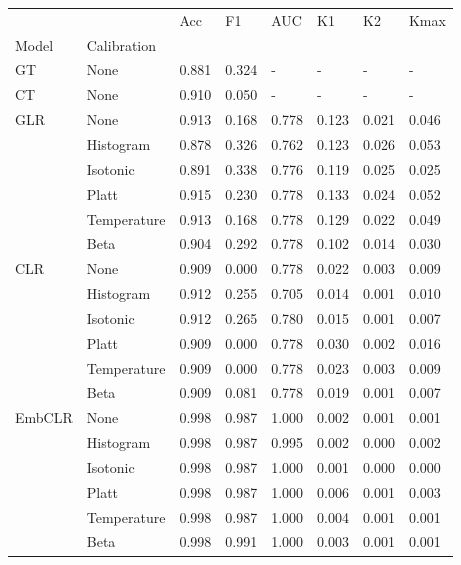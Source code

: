 \begin{tabular}{llllllll}
\toprule
 &  & Acc & F1 & AUC & K1 & K2 & Kmax \\
Model & Calibration &  &  &  &  &  &  \\
\midrule
GT & None & 0.881 & 0.324 & - & - & - & - \\
\cline{1-8}
CT & None & 0.910 & 0.050 & - & - & - & - \\
\cline{1-8}
\multirow[t]{6}{*}{GLR} & None & 0.913 & 0.168 & 0.778 & 0.123 & 0.021 & 0.046 \\
 & Histogram & 0.878 & 0.326 & 0.762 & 0.123 & 0.026 & 0.053 \\
 & Isotonic & 0.891 & 0.338 & 0.776 & 0.119 & 0.025 & 0.025 \\
 & Platt & 0.915 & 0.230 & 0.778 & 0.133 & 0.024 & 0.052 \\
 & Temperature & 0.913 & 0.168 & 0.778 & 0.129 & 0.022 & 0.049 \\
 & Beta & 0.904 & 0.292 & 0.778 & 0.102 & 0.014 & 0.030 \\
\cline{1-8}
\multirow[t]{6}{*}{CLR} & None & 0.909 & 0.000 & 0.778 & 0.022 & 0.003 & 0.009 \\
 & Histogram & 0.912 & 0.255 & 0.705 & 0.014 & 0.001 & 0.010 \\
 & Isotonic & 0.912 & 0.265 & 0.780 & 0.015 & 0.001 & 0.007 \\
 & Platt & 0.909 & 0.000 & 0.778 & 0.030 & 0.002 & 0.016 \\
 & Temperature & 0.909 & 0.000 & 0.778 & 0.023 & 0.003 & 0.009 \\
 & Beta & 0.909 & 0.081 & 0.778 & 0.019 & 0.001 & 0.007 \\
\cline{1-8}
\multirow[t]{6}{*}{EmbCLR} & None & 0.998 & 0.987 & 1.000 & 0.002 & 0.001 & 0.001 \\
 & Histogram & 0.998 & 0.987 & 0.995 & 0.002 & 0.000 & 0.002 \\
 & Isotonic & 0.998 & 0.987 & 1.000 & 0.001 & 0.000 & 0.000 \\
 & Platt & 0.998 & 0.987 & 1.000 & 0.006 & 0.001 & 0.003 \\
 & Temperature & 0.998 & 0.987 & 1.000 & 0.004 & 0.001 & 0.001 \\
 & Beta & 0.998 & 0.991 & 1.000 & 0.003 & 0.001 & 0.001 \\
\cline{1-8}
\bottomrule
\end{tabular}

